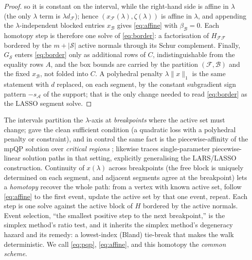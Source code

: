 \documentclass[sts]{imsart}
\newcommand{\F}{\mathcal{F}}
\newcommand{\B}{\mathcal{B}}
\newcommand{\Aset}{\mathcal{A}}
\newcommand{\Sset}{\mathcal{S}}
\theoremstyle{plain}
\theoremstyle{definition}
\begin{document}
\begin{proof}
so it is constant on the interval, while the right-hand side is affine in $\lambda$
(the only $\lambda$ term is $\lambda d_\F$); hence $(x_\F(\lambda),\zeta(\lambda))$ is
affine in $\lambda$, and appending the $\lambda$-independent blocked entries $x_\B$
gives \eqref{eq:affine} with $\beta_\B = 0$. Each homotopy step is therefore one solve
of \eqref{eq:border}: a factorisation of $H_{\F\F}$ bordered by the $m+|\Sset|$ active
normals through its Schur complement. Finally, $G_{\Sset}$ enters \eqref{eq:border}
only as additional rows of $C$, indistinguishable from the equality rows $A$, and the
box bounds are carried by the partition $(\F,\B)$ and the fixed $x_\B$, not folded into
$C$. A polyhedral penalty $\lambda\|x\|_1$ is the same statement with $d$ replaced, on
each segment, by the constant subgradient sign pattern $-s_\Aset$ of the support; that
is the only change needed to read \eqref{eq:border} as the LASSO segment solve.
\end{proof}

The intervals partition the $\lambda$-axis at \emph{breakpoints} where the active set
must change; \citet{rosset2007} gave the clean sufficient condition (a quadratic loss
with a polyhedral penalty or constraint), and in control the same fact is the
piecewise-affinity of the mpQP solution over \emph{critical regions}
\citep{bemporad2002}; \citet{roll2008} likewise traces single-parameter
piecewise-linear solution paths in that setting, explicitly generalising the
LARS/LASSO construction. Continuity of $x(\lambda)$ across breakpoints (the free block is
uniquely determined on each segment, and adjacent segments agree at the breakpoint)
lets a \emph{homotopy} recover the whole path: from a vertex with known
active set, follow \eqref{eq:affine} to the first event, update the active set by that
one event, repeat. Each step is one solve against the active block of $H$ bordered by
the active normals. Event selection, ``the smallest positive step to the next
breakpoint,'' is the simplex method's ratio test, and it inherits the simplex
method's degeneracy hazard and its remedy: a lowest-index (Bland) tie-break that makes
the walk deterministic. We call \eqref{eq:pqp}, \eqref{eq:affine}, and this homotopy
the \emph{common scheme}.
\end{document}
